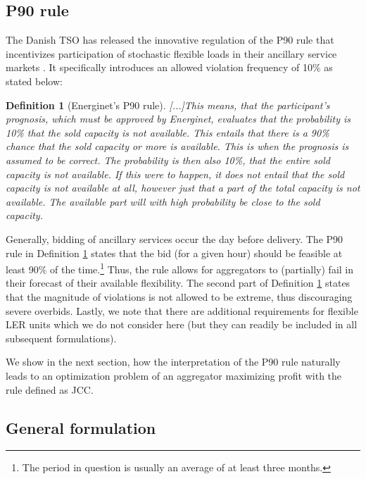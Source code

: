 \documentclass[conference]{IEEEtran}
\newtheorem{definition}{Definition} %
\begin{document}
\subsection{P90 rule}

The Danish \ac{TSO} has released the innovative regulation of the P90 rule that incentivizes participation of stochastic flexible loads in their ancillary service markets \cite{energinet}. It specifically introduces an allowed violation frequency of 10\% as stated below:

\begin{definition}[Energinet's P90 rule]\label{def:P90}
    \textit{[...]This means, that the participant's prognosis, which must be approved by Energinet, evaluates that the probability is 10\% that the sold capacity is not available. This entails that there is a 90\% chance that the sold capacity or more is available. This is when the prognosis is assumed to be correct.
    The probability is then also 10\%, that the entire sold capacity is not available. If this were to happen, it does not entail that the sold capacity is not available at all, however just that a part of the total capacity is not available. The available part will with high probability be close to the sold capacity.}
\end{definition}

Generally, bidding of ancillary services occur the day before delivery. The P90 rule in Definition \ref{def:P90} states that the bid (for a given hour) should be feasible at least 90\% of the time.\footnote{The period in question is usually an average of at least three months.} Thus, the rule allows for aggregators to (partially) fail in their forecast of their available flexibility. The second part of Definition \ref{def:P90} states that the magnitude of violations is not allowed to be extreme, thus discouraging severe overbids. Lastly, we note that there are additional requirements for flexible \ac{LER} units \cite{energinet} which we do not consider here (but they can readily be included in all subsequent formulations).

We show in the next section, how the interpretation of the P90 rule naturally leads to an optimization problem of an aggregator maximizing profit with the rule defined as \ac{JCC}.


\subsection{General formulation}
\end{document}
